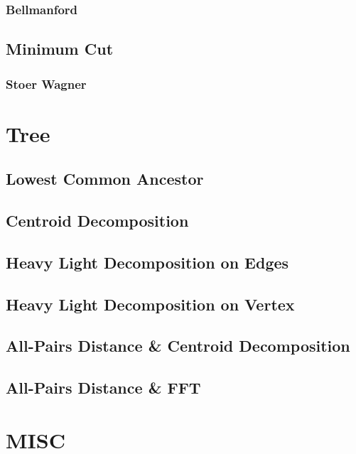 \documentclass[10pt,a4paper]{report}
\begin{document}
			\subsubsection{Bellmanford}
		\subsection{Minimum Cut}
			\subsubsection{Stoer Wagner}
				
	
	\newpage
	\section{Tree}
		\subsection{Lowest Common Ancestor}
			
		\newpage
		\subsection{Centroid Decomposition}
			
		\newpage
		\subsection{Heavy Light Decomposition on Edges}
			
		\subsection{Heavy Light Decomposition on Vertex}
		\subsection{All-Pairs Distance \& Centroid Decomposition}
		\subsection{All-Pairs Distance \& FFT}
		
	\section{MISC}
\end{document}
